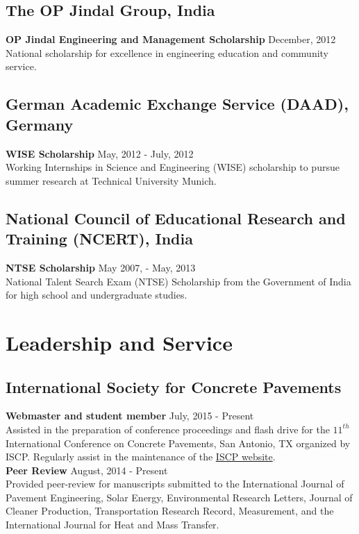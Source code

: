 \documentclass[12pt]{article}
\begin{document}
\subsection*{The OP Jindal Group, India} 
\textbf{OP Jindal Engineering and Management Scholarship} \hfill December, 2012 \\
National scholarship for excellence in engineering education and community service. \\

\subsection*{German Academic Exchange Service (DAAD), Germany} 
\textbf{WISE Scholarship} \hfill May, 2012 - July, 2012 \\
Working Internships in Science and Engineering (WISE) scholarship to pursue summer research at Technical University Munich. \\

\subsection*{National Council of Educational Research and Training (NCERT), India} 
\textbf{NTSE Scholarship} \hfill May 2007, - May, 2013 \\
National Talent Search Exam (NTSE) Scholarship from the Government of India for high school and undergraduate studies. \\

\section*{Leadership and Service}
\subsection*{International Society for Concrete Pavements}
\textbf{Webmaster and student member} \hfill July, 2015 - Present \\
Assisted in the preparation of conference proceedings and flash drive for the $11^{th}$ International Conference on Concrete Pavements, San Antonio, TX organized by ISCP. Regularly assist in the maintenance of the \href{concretepavements.org}{ISCP website}. \\

\textbf{Peer Review} \hfill August, 2014 - Present \\
Provided peer-review for manuscripts submitted to the International Journal of Pavement Engineering, Solar Energy, Environmental Research Letters, Journal of Cleaner Production, Transportation Research Record, Measurement, and the International Journal for Heat and Mass Transfer. \\
\end{document}
